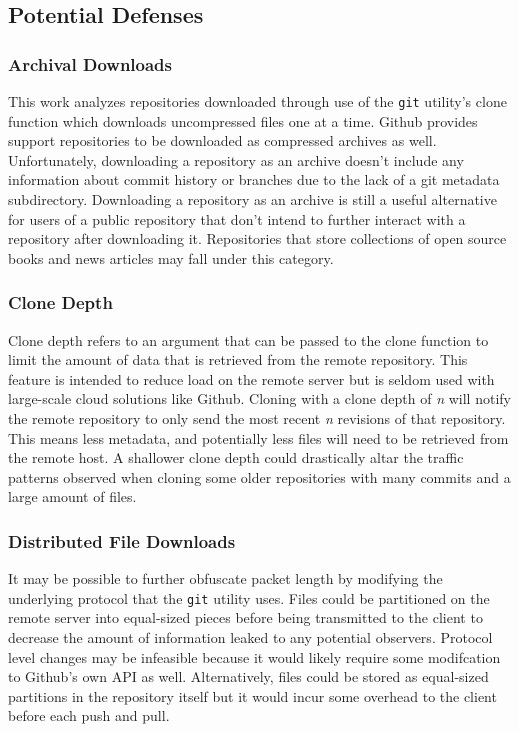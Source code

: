 \documentclass[sigconf,authorversion,nonacm]{acmart}
\begin{document}
\subsection{Potential Defenses}
\subsubsection*{Archival Downloads}
This work analyzes repositories downloaded through use of the \texttt{git} utility's clone function which downloads uncompressed files one at a time. Github provides support repositories to be downloaded as compressed archives as well. Unfortunately, downloading a repository as an archive doesn't include any information about commit history or branches due to the lack of a git metadata subdirectory. Downloading a repository as an archive is still a useful alternative for users of a public repository that don't intend to further interact with a repository after downloading it. Repositories that store collections of open source books and news articles may fall under this category.

\subsubsection*{Clone Depth}
Clone depth refers to an argument that can be passed to the clone function to limit the amount of data that is retrieved from the remote repository. This feature is intended to reduce load on the remote server but is seldom used with large-scale cloud solutions like Github. Cloning with a clone depth of \textit{n} will notify the remote repository to only send the most recent \textit{n} revisions of that repository. This means less metadata, and potentially less files will need to be retrieved from the remote host. A shallower clone depth could drastically altar the traffic patterns observed when cloning some older repositories with many commits and a large amount of files.

\subsubsection*{Distributed File Downloads} It may be possible to further obfuscate packet length by modifying the underlying protocol that the \texttt{git} utility uses. Files could be partitioned on the remote server into equal-sized pieces before being transmitted to the client to decrease the amount of information leaked to any potential observers. Protocol level changes may be infeasible because it would likely require some modifcation to Github's own API as well. Alternatively, files could be stored as equal-sized partitions in the repository itself but it would incur some overhead to the client before each push and pull.
\end{document}
